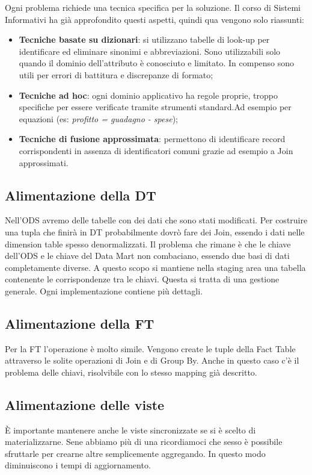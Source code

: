 Ogni problema richiede una tecnica specifica per la soluzione. Il corso di Sistemi Informativi ha già approfondito questi aspetti, quindi qua vengono solo riassunti:

\begin{itemize}
	\item \textbf{Tecniche basate su dizionari}: si utilizzano tabelle di look-up per identificare ed eliminare sinonimi e abbreviazioni. Sono utilizzabili solo quando il dominio dell'attributo è conosciuto e limitato. In compenso sono utili per errori di battitura e discrepanze di formato;
	\item \textbf{Tecniche ad hoc}: ogni dominio applicativo ha regole proprie, troppo specifiche per essere verificate tramite strumenti standard.Ad esempio per equazioni (es: \textit{profitto = guadagno - spese});
	\item \textbf{Tecniche di fusione approssimata}: permettono di identificare record corrispondenti in assenza di identificatori comuni grazie ad esempio a Join approssimati.
\end{itemize}

\subsection{Alimentazione della DT}
Nell'ODS avremo delle tabelle con dei dati che sono stati modificati. Per costruire una tupla che finirà in DT probabilmente dovrò fare dei Join, essendo i dati nelle dimension table spesso denormalizzati. Il problema che rimane è che le chiave dell'ODS e le chiave del Data Mart non combaciano, essendo due basi di dati completamente diverse. A questo scopo si mantiene nella staging area una tabella contenente le corrispondenze tra le chiavi. Questa si tratta di una gestione generale. Ogni implementazione contiene più dettagli.


\subsection{Alimentazione della FT}
Per la FT l'operazione è molto simile. Vengono create le tuple della Fact Table attraverso le solite operazioni di Join e di Group By. Anche in questo caso c'è il problema delle chiavi, risolvibile con lo stesso mapping già descritto.


\subsection{Alimentazione delle viste}
È importante mantenere anche le viste sincronizzate se si è scelto di materializzarne. Sene abbiamo più di una ricordiamoci che sesso è possibile sfruttarle per crearne altre semplicemente aggregando. In questo modo diminuiscono i tempi di aggiornamento.
